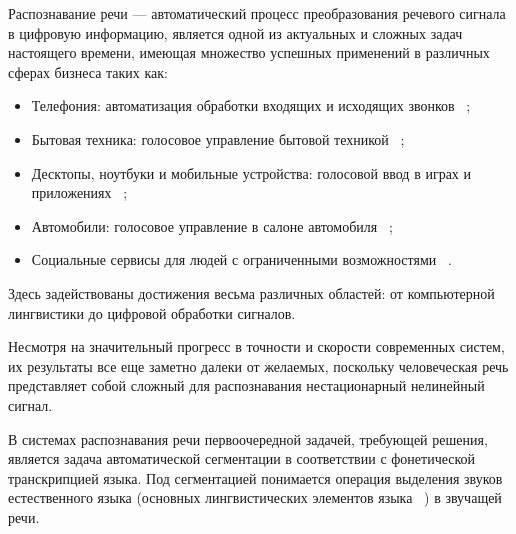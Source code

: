 \documentclass[utf8x, 14pt, oneside, a4paper]{article}
\begin{document}
	Распознавание речи — автоматический процесс преобразования речевого сигнала в цифровую информацию, является одной из актуальных и сложных задач настоящего времени, имеющая множество успешных применений в различных сферах бизнеса таких как:
	\begin{itemize}
		\item Телефония: автоматизация обработки входящих и исходящих звонков ~\cite{speech_phone_machines};
		\item Бытовая техника: голосовое управление бытовой техникой ~\cite{speech_phone_machines};
		\item Десктопы, ноутбуки и мобильные устройства: голосовой ввод в играх и приложениях ~\cite{speech_phone_machines};
		\item Автомобили: голосовое управление в салоне автомобиля ~\cite{speech_phone_machines};
		\item Социальные сервисы для людей с ограниченными возможностями ~\cite{speech_people}.
	\end{itemize}

	Здесь задействованы достижения весьма различных областей: от компьютерной лингвистики до цифровой обработки сигналов.
	
	Несмотря на значительный прогресс в точности и скорости современных систем, их результаты все еще заметно далеки от желаемых, поскольку человеческая речь представляет собой сложный для распознавания нестационарный нелинейный сигнал.
	
	В системах распознавания речи первоочередной задачей, требующей решения, является задача автоматической сегментации в соответствии с фонетической транскрипцией языка. Под сегментацией понимается операция выделения звуков естественного языка (основных лингвистических элементов языка ~\cite{ling_elem}) в звучащей речи.
	
\end{document}
